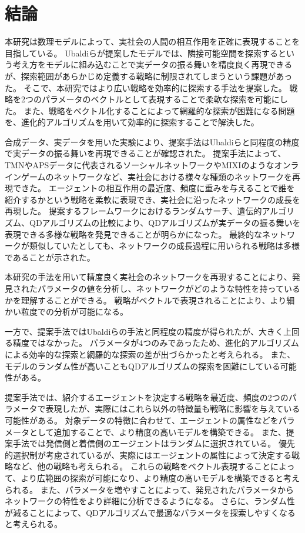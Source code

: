 \documentclass[uplatex,11pt,openany]{ujreport}
\begin{document}
\chapter{結論}
    本研究は数理モデルによって、実社会の人間の相互作用を正確に表現することを目指している。
    Ubaldiらが提案したモデルでは、隣接可能空間を探索するという考え方をモデルに組み込むことで実データの振る舞いを精度良く再現できるが、探索範囲があらかじめ定義する戦略に制限されてしまうという課題があった。
    そこで、本研究ではより広い戦略を効率的に探索する手法を提案した。
    戦略を2つのパラメータのベクトルとして表現することで柔軟な探索を可能にした。
    また、戦略をベクトル化することによって網羅的な探索が困難になる問題を、進化的アルゴリズムを用いて効率的に探索することで解決した。

    合成データ、実データを用いた実験により、提案手法はUbaldiらと同程度の精度で実データの振る舞いを再現できることが確認された。
    提案手法によって、TMNやAPSデータに代表されるソーシャルネットワークやMIXIのようなオンラインゲームのネットワークなど、実社会における様々な種類のネットワークを再現できた。
    エージェントの相互作用の最近度、頻度に重みを与えることで誰を紹介するかという戦略を柔軟に表現でき、実社会に沿ったネットワークの成長を再現した。
    提案するフレームワークにおけるランダムサーチ、遺伝的アルゴリズム、QDアルゴリズムの比較により、QDアルゴリズムが実データの振る舞いを表現できる多様な戦略を発見できることが明らかになった。
    最終的なネットワークが類似していたとしても、ネットワークの成長過程に用いられる戦略は多様であることが示された。

    本研究の手法を用いて精度良く実社会のネットワークを再現することにより、発見されたパラメータの値を分析し、ネットワークがどのような特性を持っているかを理解することができる。
    戦略がベクトルで表現されることにより、より細かい粒度での分析が可能になる。

    一方で、提案手法ではUbaldiらの手法と同程度の精度が得られたが、大きく上回る精度ではなかった。
    パラメータが4つのみであったため、進化的アルゴリズムによる効率的な探索と網羅的な探索の差が出づらかったと考えられる。
    また、モデルのランダム性が高いこともQDアルゴリズムの探索を困難にしている可能性がある。

    提案手法では、紹介するエージェントを決定する戦略を最近度、頻度の2つのパラメータで表現したが、実際にはこれら以外の特徴量も戦略に影響を与えている可能性がある。
    対象データの特徴に合わせて、エージェントの属性などをパラメータとして追加することで、より精度の高いモデルを構築できる。
    また、提案手法では発信側と着信側のエージェントはランダムに選択されている。
    優先的選択制が考慮されているが、実際にはエージェントの属性によって決定する戦略など、他の戦略も考えられる。
    これらの戦略をベクトル表現することによって、より広範囲の探索が可能になり、より精度の高いモデルを構築できると考えられる。
    また、パラメータを増やすことによって、発見されたパラメータからネットワークの特性をより詳細に分析できるようになる。
    さらに、ランダム性が減ることによって、QDアルゴリズムで最適なパラメータを探索しやすくなると考えられる。
\end{document}
